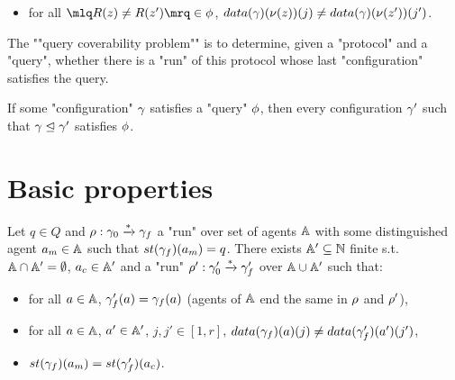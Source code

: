\begin{definition}[Semantics]
\begin{definition}
\begin{itemize}
			\item for all $\quotemarks{R(\var{z}) \neq R(\var{z'})} \in \query$, $\data{\config}(\nu(\var{z}))(j) \neq \data{\config}(\nu(\var{z'}))(j')$.
		\end{itemize}
		
		\AP The ""query coverability problem"" is to determine, given a "protocol" and a "query", whether there is a "run" of this protocol whose last "configuration" satisfies the query.
	\end{definition}
	
	\begin{remark}
		\label{rem:bigger_config_query}
		If some "configuration" $\gamma$ satisfies a "query" $\phi$, then every configuration $\gamma'$ such that $\gamma \trianglelefteq \gamma'$ satisfies $\phi$. 
	\end{remark}
	
\end{definition}

\section{Basic properties}


\begin{lemma}\label{lem:weak_copycat}
	Let $q \in Q$ and  $\rho : \gamma_0 \xrightarrow{*} \gamma_f$ a "run" over set of agents $\mathbb{A}$ with some distinguished agent $a_m \in \mathbb{A}$ such that $\st{\config_f}(a_m) = q$. There exists $\mathbb{A}' \subseteq \mathbb{N}$ finite s.t. $\mathbb{A} \cap \mathbb{A}' = \emptyset$, $a_c \in \mathbb{A}'$ and a "run" $\rho': \gamma_0' \xrightarrow{*} \gamma_f'$ over $\mathbb{A} \cup \mathbb{A}'$ such that:
	\begin{itemize}
		\item for all $a \in \mathbb{A}$, $\gamma_f'(a) = \gamma_f(a)$ (agents of $\mathbb{A}$ end the same in $\rho$ and $\rho'$),
		\item for all $a \in \mathbb{A}$, $a' \in \mathbb{A}'$, $j, j' \in [1,r]$, $\data{\config_f}(a)(j) \ne \data{\config_f'}(a')(j')$,
		\item $\st{\config_f}(a_m) = \st{\config_f'}(a_c)$.
	\end{itemize}
\end{lemma}


